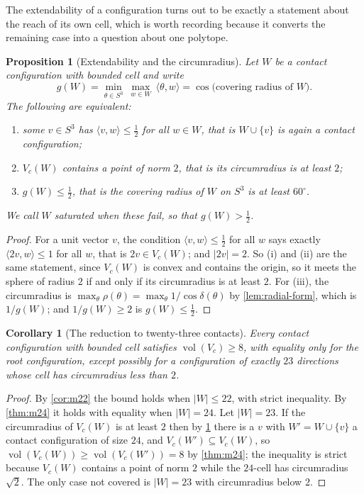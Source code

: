\documentclass[11pt,reqno]{amsart}
\renewcommand{\_}{\origunderscore\allowbreak}
\numberwithin{equation}{section}
\theoremstyle{plain}
\newtheorem{prop}[thm]{Proposition}
\newtheorem{cor}[thm]{Corollary}
\theoremstyle{definition}
\theoremstyle{remark}
\DeclareMathOperator{\vol}{vol}
\begin{document}
The extendability of a configuration turns out to be exactly a statement
about the reach of its own cell, which is worth recording because it
converts the remaining case into a question about one polytope.

\begin{prop}[Extendability and the circumradius]\label{prop:extendable}
Let $W$ be a contact configuration with bounded cell and write
\[
  g(W)=\min_{\theta\in S^3}\ \max_{w\in W}\ \langle\theta,w\rangle
      =\cos\bigl(\text{covering radius of }W\bigr).
\]
The following are equivalent:
\begin{enumerate}[label=\textup{(\roman*)},leftmargin=2.2em]
\item some $v\in S^3$ has $\langle v,w\rangle\le\tfrac12$ for all $w\in
W$, that is $W\cup\{v\}$ is again a contact configuration;
\item $V_c(W)$ contains a point of norm $2$, that is its circumradius is
at least $2$;
\item $g(W)\le\tfrac12$, that is the covering radius of $W$ on $S^3$ is
at least $60^\circ$.
\end{enumerate}
We call $W$ \emph{saturated} when these fail, so that $g(W)>\tfrac12$.
\end{prop}

\begin{proof}
For a unit vector $v$, the condition $\langle v,w\rangle\le\tfrac12$ for
all $w$ says exactly $\langle 2v,w\rangle\le1$ for all $w$, that is
$2v\in V_c(W)$; and $|2v|=2$. So (i) and (ii) are the same statement,
since $V_c(W)$ is convex and contains the origin, so it meets the sphere
of radius $2$ if and only if its circumradius is at least $2$. For (iii),
the circumradius is $\max_\theta\rho(\theta)=\max_\theta1/\cos\delta(\theta)$
by \cref{lem:radial-form}, which is $1/g(W)$; and $1/g(W)\ge2$ is
$g(W)\le\tfrac12$.
\end{proof}

\begin{cor}[The reduction to twenty-three contacts]\label{cor:remaining}
Every contact configuration with bounded cell satisfies $\vol(V_c)\ge8$, with equality only for the root
configuration, except possibly for a configuration of exactly $23$
directions whose cell has circumradius less than $2$.
\end{cor}

\begin{proof}
By \cref{cor:m22} the bound holds when $|W|\le22$, with strict
inequality. By \cref{thm:m24} it holds with equality when $|W|=24$. Let
$|W|=23$. If the circumradius of $V_c(W)$ is at least $2$ then by
\cref{prop:extendable} there is a $v$ with $W'=W\cup\{v\}$ a contact
configuration of size $24$, and $V_c(W')\subseteq V_c(W)$, so
$\vol(V_c(W))\ge\vol(V_c(W'))=8$ by \cref{thm:m24}; the inequality is
strict because $V_c(W)$ contains a point of norm $2$ while the $24$-cell
has circumradius $\sqrt2$. The only case not covered is $|W|=23$ with
circumradius below $2$.
\end{proof}
\end{document}
